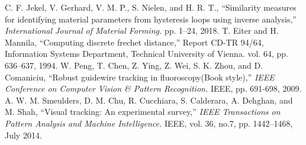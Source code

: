 \documentclass[letterpaper, 10 pt, conference]{ieeeconf}  %
\begin{document}
\begin{thebibliography}{99}
  C. F. Jekel, V. Gerhard, V. M. P., S. Nielen, and H. R. T., “Similarity measures for identifying material parameters from hysteresis loops using inverse analysis,”  \emph{ International Journal of Material Forming. } pp. 1–24, 2018.
 T. Eiter and H. Mannila, “Computing discrete frechet distance,”  Report CD-TR 94/64, Information Systems Department, Technical University of Vienna. vol. 64, pp. 636–637, 1994.
 W. Peng, T. Chen, Z. Ying, Z. Wei, S. K. Zhou, and D. Comaniciu, “Robust guidewire tracking in fluoroscopy(Book style),”  \emph{ IEEE Conference on Computer Vision & Pattern Recognition.} IEEE, pp. 691-698, 2009.
 A. W. M. Smeulders, D. M. Chu, R. Cucchiara, S. Calderara, A. Dehghan, and M. Shah, “Visual tracking: An experimental survey,”  \emph{ IEEE Transactions on Pattern Analysis and Machine Intelligence.} IEEE, vol. 36, no.7, pp. 1442–1468, July 2014.

\end{thebibliography}
\end{document}
